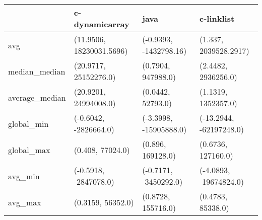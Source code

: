 \begin{tabular}{llll}
\toprule
{} &            c-dynamicarray &                    java &               c-linklist \\
\midrule
avg            &  (11.9506, 18230031.5696) &  (-0.9393, -1432798.16) &    (1.337, 2039528.2917) \\
median\_median  &     (20.9717, 25152276.0) &      (0.7904, 947988.0) &      (2.4482, 2936256.0) \\
average\_median &     (20.9201, 24994008.0) &       (0.0442, 52793.0) &      (1.1319, 1352357.0) \\
global\_min     &     (-0.6042, -2826664.0) &  (-3.3998, -15905888.0) &  (-13.2944, -62197248.0) \\
global\_max     &          (0.408, 77024.0) &       (0.896, 169128.0) &       (0.6736, 127160.0) \\
avg\_min        &     (-0.5918, -2847078.0) &   (-0.7171, -3450292.0) &   (-4.0893, -19674824.0) \\
avg\_max        &         (0.3159, 56352.0) &      (0.8728, 155716.0) &        (0.4783, 85338.0) \\
\bottomrule
\end{tabular}

